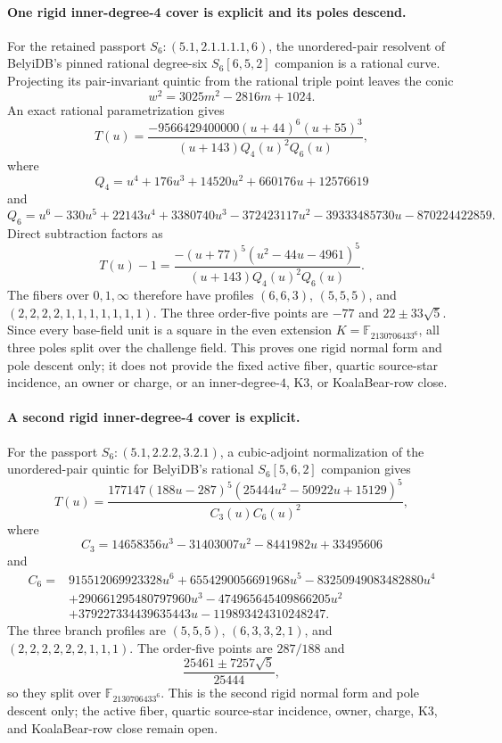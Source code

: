 \documentclass[11pt]{article}
\begin{document}
\paragraph{One rigid inner-degree-4 cover is explicit and its poles descend.}
For the retained passport
\(S_6:(5.1,2.1.1.1.1,6)\), the unordered-pair resolvent of BelyiDB's pinned
rational degree-six \(S_6[6,5,2]\) companion is a rational curve.  Projecting
its pair-invariant quintic from the rational triple point leaves the conic
\[
  w^2=3025m^2-2816m+1024.
\]
An exact rational parametrization gives
\[
 T(u)=\frac{-9566429400000(u+44)^6(u+55)^3}
 {(u+143)Q_4(u)^2Q_6(u)},
\]
where
\[
 Q_4=u^4+176u^3+14520u^2+660176u+12576619
\]
and
\[
 Q_6=u^6-330u^5+22143u^4+3380740u^3
      -372423117u^2-39333485730u-870224422859.
\]
Direct subtraction factors as
\[
 T(u)-1=
 \frac{-(u+77)^5(u^2-44u-4961)^5}
 {(u+143)Q_4(u)^2Q_6(u)}.
\]
The fibers over \(0,1,\infty\) therefore have profiles
\((6,6,3)\), \((5,5,5)\), and
\((2,2,2,2,1,1,1,1,1,1,1)\).  The three order-five points are
\(-77\) and \(22\pm33\sqrt5\).  Since every base-field unit is a square in
the even extension \(K=\mathbb F_{2130706433^6}\), all three poles split
over the challenge field.  This proves one rigid normal form and pole
descent only; it does not provide the fixed active fiber, quartic source-star
incidence, an owner or charge, or an inner-degree-\(4\), K3, or KoalaBear-row
close.

\paragraph{A second rigid inner-degree-4 cover is explicit.}
For the passport \(S_6:(5.1,2.2.2,3.2.1)\), a cubic-adjoint normalization of
the unordered-pair quintic for BelyiDB's rational \(S_6[5,6,2]\) companion
gives
\[
 T(u)=\frac{177147(188u-287)^5
 (25444u^2-50922u+15129)^5}{C_3(u)C_6(u)^2},
\]
where
\[
 C_3=14658356u^3-31403007u^2-8441982u+33495606
\]
and
\[
\begin{split}
 C_6={}&915512069923328u^6+6554290056691968u^5
 -83250949083482880u^4\\
 &+290661295480797960u^3-474965645409866205u^2\\
 &+379227334439635443u-119893424310248247.
\end{split}
\]
The three branch profiles are \((5,5,5)\), \((6,3,3,2,1)\), and
\((2,2,2,2,2,2,1,1,1)\).  The order-five points are \(287/188\) and
\[
  \frac{25461\pm7257\sqrt5}{25444},
\]
so they split over \(\mathbb F_{2130706433^6}\).  This is the second rigid
normal form and pole descent only; the active fiber, quartic source-star
incidence, owner, charge, K3, and KoalaBear-row close remain open.
\end{document}
